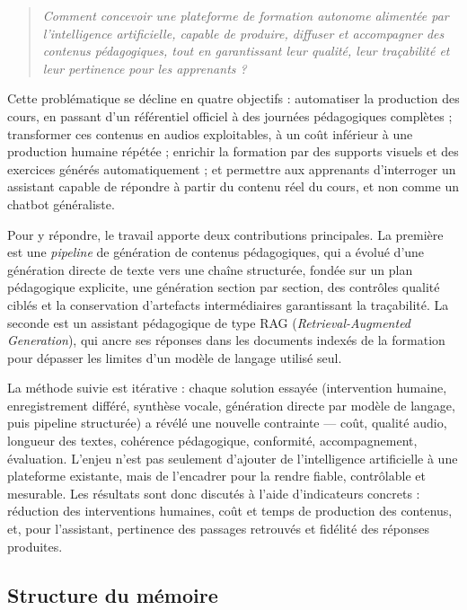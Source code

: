\documentclass[12pt,a4paper]{article}
\begin{document}
\begin{quote}
\emph{Comment concevoir une plateforme de formation autonome alimentée par
l'intelligence artificielle, capable de produire, diffuser et accompagner des contenus
pédagogiques, tout en garantissant leur qualité, leur traçabilité et leur pertinence pour
les apprenants ?}
\end{quote}

Cette problématique se décline en quatre objectifs : automatiser la production des cours, en
passant d'un référentiel officiel à des journées pédagogiques complètes ; transformer ces
contenus en audios exploitables, à un coût inférieur à une production humaine répétée ;
enrichir la formation par des supports visuels et des exercices générés automatiquement ;
et permettre aux apprenants d'interroger un assistant capable de répondre à partir du contenu
réel du cours, et non comme un chatbot généraliste.

Pour y répondre, le travail apporte deux contributions principales. La première est une
\emph{pipeline} de génération de contenus pédagogiques, qui a évolué d'une génération
directe de texte vers une chaîne structurée, fondée sur un plan pédagogique explicite, une
génération section par section, des contrôles qualité ciblés et la conservation d'artefacts
intermédiaires garantissant la traçabilité. La seconde est un assistant pédagogique de type
RAG (\emph{Retrieval-Augmented Generation}), qui ancre ses réponses dans les documents
indexés de la formation pour dépasser les limites d'un modèle de langage utilisé seul.

La méthode suivie est itérative : chaque solution essayée (intervention humaine,
enregistrement différé, synthèse vocale, génération directe par modèle de langage, puis
pipeline structurée) a révélé une nouvelle contrainte — coût, qualité audio, longueur des
textes, cohérence pédagogique, conformité, accompagnement, évaluation. L'enjeu n'est pas
seulement d'ajouter de l'intelligence artificielle à une plateforme existante, mais de
l'encadrer pour la rendre fiable, contrôlable et mesurable. Les résultats sont donc discutés à
l'aide d'indicateurs concrets : réduction des interventions humaines, coût et temps de
production des contenus, et, pour l'assistant, pertinence des passages retrouvés et fidélité des
réponses produites.

\subsection*{Structure du mémoire}
\end{document}
